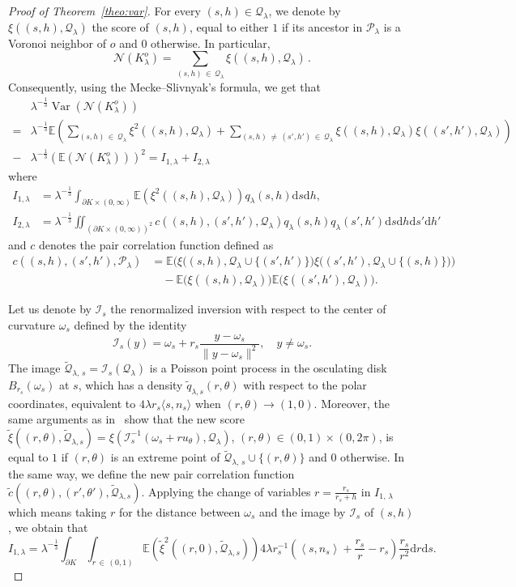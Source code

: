 \documentclass[AHL,Unicode,longabstracts,published]{cedram}
\newcommand{\cN}{\mathcal{N}}
\newcommand{\cP}{\mathcal{P}}
\newcommand{\cQ}{\mathcal{Q}}
\newcommand{\cI}{\mathcal{I}}
\newcommand{\la}{\lambda}
\newcommand{\dd}{\mathrm{d}}
\newcommand{\E}{\mathbb{E}}
\DeclareMathOperator{\Var}{Var}
\newcommand{\pass}{\vspace{0.3cm}\noindent}
\newcommand{\noi}{\noindent}
\begin{document}
\begin{proof}[{Proof of Theorem~\ref{theo:var}}]
 For every $(s,h)\in \cQ_\la$, we denote by $\xi((s,h),\cQ_\la)$ the score of $(s,h)$, equal to either $1$ if its ancestor in $\cP_\lambda$ is a Voronoi neighbor of $o$ and $0$ otherwise. In particular,
\[
{\cN}(K_{\lambda}^o)=\sum_{(s,h)\,\in\,\cQ_\la} \xi\left((s,h),\cQ_\la\right)\,.
\]
Consequently, using the Mecke--Slivnyak's formula, we get that
\begin{align}
&\la^{-\frac{1}{3}}\Var(\cN(K_{\lambda}^o))\nonumber\\
=&\la^{-\frac{1}{3}}\E\left(\sum_{(s,h)\,\in\, \cQ_\la}\xi^2((s,h),\cQ_\la)+\sum_{(s,h)\,\ne\, (s',h')\,\in\, \cQ_\la}\xi\left((s,h),\cQ_\la\right)\xi\left((s',h'),\cQ_\la\right)\right)\nonumber\\
-&\la^{-\frac{1}{3}}\left(\E(\cN(K_{\lambda}^o))\right)^2=I_{1,\lambda}+I_{2,\lambda}\label{eq:decompvar}
\end{align}
where
\begin{align*}
I_{1,\lambda}&=\lambda^{-\frac{1}{3}}\int_{\partial K\times (0,\infty)}\E\left(\xi^2((s,h),\cQ_\la)\right)q_\lambda(s,h)\dd s\dd h,\\
I_{2,\lambda}&=\lambda^{-\frac{1}{3}}\iint_{(\partial K\times (0,\infty))^2}c\left((s,h),(s',h'),\cQ_\la\right)q_\lambda(s,h)q_\lambda(s',h')\dd s\dd h\dd s'\dd h'
\end{align*}
and $c$ denotes the pair correlation function defined as
\begin{align*}
c\left((s,h),(s',h'),\cP_\la\right)&=\E\Big(\xi\big((s,h),\cQ_\la\cup\{(s',h')\}\big)\xi\big((s',h'),\cQ_\la\cup\{(s,h)\}\big)\Big)\\
&\quad-\E\big(\xi((s,h),\cQ_\la)\big)\E\big(\xi((s',h'),\cQ_\la)\big).
\end{align*}

Let us denote by $\cI_s$ the renormalized inversion with respect to the center of curvature $\omega_s$ defined by the identity
\[
\cI_s(y)=\omega_s+r_s\frac{y-\omega_s}{\|y-\omega_s\|^2},\quad y\ne \omega_s.
\]
The image $\widetilde{\cQ}_{\la,\,s}=\cI_s(\cQ_\la)$ is a Poisson point process in the osculating disk $B_{r_s}(\omega_s)$ at $s$, which has a density $\widetilde{q}_{\lambda,s}(r,\theta)$ with respect to the polar coordinates, equivalent to $4\lambda r_s\langle s,n_s\rangle$ when $(r,\theta)\to (1,0)$. Moreover, the same arguments as in~\cite[Lemma~1]{cs05} show that the new score $\widetilde{\xi}((r,\theta),\widetilde{\cQ}_{\la,s})=\xi(\cI_s^{-1}(\omega_s+ru_{\theta}),\cQ_\la)$, $(r,\theta)\in (0,1)\times(0,2\pi)$, is equal to $1$ if $(r,\theta)$ is an extreme point of $\widetilde{\cQ}_{\la,\,s}\cup\{(r,\theta)\}$ and $0$ otherwise. In the same way, we define the new pair correlation function $\widetilde{c}((r,\theta), (r',\theta'),\widetilde{\cQ}_{\la,s})$. Applying the change of variables $r=\frac{r_s}{r_s+h}$ in $I_{1,\,\lambda}$ which means taking $r$ for the distance between $\omega_s$ and the image by $\cI_s$ of $(s,h)$, we obtain that
\[
I_{1,\lambda}= \lambda^{-\frac{1}{3}}\int_{\partial K}\int_{r\,\in\,(0,1)}\E\left(\widetilde{\xi}^2\left((r,0),\widetilde{\cQ}_{\la,s}\right)\right)4\lambda r_s^{-1}\left(\left\langle s,n_s\right\rangle+\frac{r_s}{r}-r_s\right)\frac{r_s}{r^2}\dd r\dd s.
\]


\end{proof}
\end{document}
